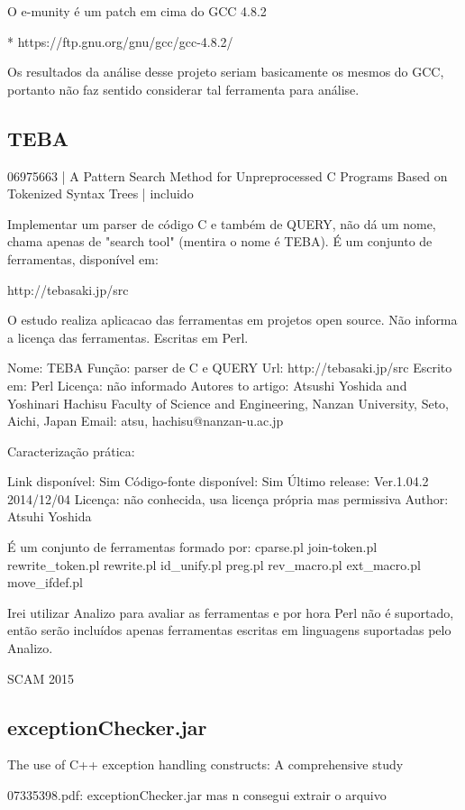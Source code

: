 O e-munity é um patch em cima do GCC 4.8.2

* https://ftp.gnu.org/gnu/gcc/gcc-4.8.2/

Os resultados da análise desse projeto seriam basicamente os mesmos do GCC, portanto não
faz sentido considerar tal ferramenta para análise.


\subsection{TEBA}

06975663 | A Pattern Search Method for Unpreprocessed C Programs Based on Tokenized Syntax Trees | incluido

Implementar um parser de código C e também de QUERY, não dá um nome, chama
apenas de "search tool" (mentira o nome é TEBA). É um conjunto de ferramentas, disponível em:

http://tebasaki.jp/src

O estudo realiza aplicacao das ferramentas em projetos open source. Não
informa a licença das ferramentas. Escritas em Perl.

Nome: TEBA
Função: parser de C e QUERY
Url: http://tebasaki.jp/src
Escrito em: Perl
Licença: não informado
Autores to artigo: Atsushi Yoshida and Yoshinari Hachisu
                   Faculty of Science and Engineering, Nanzan University, Seto, Aichi, Japan
                   Email: {atsu, hachisu}@nanzan-u.ac.jp

Caracterização prática:

Link disponível: Sim
Código-fonte disponível: Sim
Último release:  Ver.1.04.2 2014/12/04
Licença: não conhecida, usa licença própria mas permissiva
Author: Atsuhi Yoshida

É um conjunto de ferramentas formado por: cparse.pl join-token.pl
rewrite\_token.pl rewrite.pl id\_unify.pl preg.pl rev\_macro.pl ext\_macro.pl
move\_ifdef.pl

Irei utilizar Analizo para avaliar as ferramentas e por hora Perl não é suportado, então
serão incluídos apenas ferramentas escritas em linguagens suportadas pelo Analizo.

SCAM 2015

\subsection{exceptionChecker.jar}

The use of C++ exception handling constructs: A comprehensive study

07335398.pdf: exceptionChecker.jar mas n consegui extrair o arquivo

